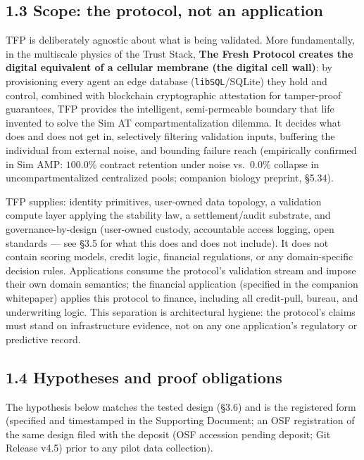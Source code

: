 \documentclass[11pt,twocolumn]{article}
\begin{document}
\subsection*{1.3 Scope: the protocol, not an
application}

TFP is deliberately agnostic about what is being validated. More fundamentally, in the multiscale physics of the Trust Stack, \textbf{The Fresh Protocol creates the digital equivalent of a cellular membrane (the digital cell wall)}: by provisioning every agent an edge database (\texttt{libSQL}/SQLite) they hold and control, combined with blockchain cryptographic attestation for tamper-proof guarantees, TFP provides the intelligent, semi-permeable boundary that life invented to solve the Sim AT compartmentalization dilemma. It decides what does and does not get in, selectively filtering validation inputs, buffering the individual from external noise, and bounding failure reach (empirically confirmed in Sim AMP: $100.0\%$ contract retention under noise vs.\ $0.0\%$ collapse in uncompartmentalized centralized pools; companion biology preprint, \S{}5.34).

TFP supplies: identity primitives, user-owned data topology, a validation compute
layer applying the stability law, a settlement/audit substrate, and
governance-by-design (user-owned custody, accountable access logging,
open standards --- see §3.5 for what this does and does not include). It
does not contain scoring models, credit logic, financial regulations, or
any domain-specific decision rules. Applications consume the protocol's
validation stream and impose their own domain semantics; the financial application (specified in the companion whitepaper) applies this protocol to finance, including all credit-pull, bureau, and
underwriting logic. This separation is architectural hygiene: the
protocol's claims must stand on infrastructure evidence, not on any one
application's regulatory or predictive record.

\subsection*{1.4 Hypotheses and proof
obligations}

The hypothesis below matches the tested design (§3.6) and is the
registered form (specified and timestamped in the Supporting Document;
an OSF registration of the same design filed with the deposit (OSF accession pending deposit; Git Release v4.5) prior to any pilot data collection).
\end{document}
